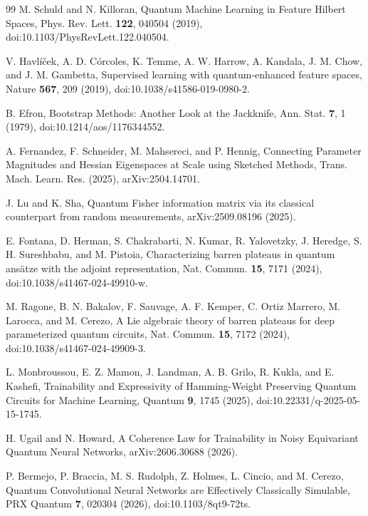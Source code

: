 \documentclass[aps,pra,reprint,superscriptaddress,nofootinbib,longbibliography]{revtex4-2}
\begin{document}
\begin{thebibliography}{99}
M. Schuld and N. Killoran,
Quantum Machine Learning in Feature Hilbert Spaces,
Phys. Rev. Lett. \textbf{122}, 040504 (2019),
doi:10.1103/PhysRevLett.122.040504.

V. Havl\'{i}\v{c}ek, A. D. C\'{o}rcoles, K. Temme, A. W. Harrow, A. Kandala, J. M. Chow, and J. M. Gambetta,
Supervised learning with quantum-enhanced feature spaces,
Nature \textbf{567}, 209 (2019),
doi:10.1038/s41586-019-0980-2.

B. Efron,
Bootstrap Methods: Another Look at the Jackknife,
Ann. Stat. \textbf{7}, 1 (1979),
doi:10.1214/aos/1176344552.



A. Fernandez, F. Schneider, M. Mahsereci, and P. Hennig,
Connecting Parameter Magnitudes and Hessian Eigenspaces at Scale using Sketched Methods,
Trans. Mach. Learn. Res. (2025), arXiv:2504.14701.

J. Lu and K. Sha,
Quantum Fisher information matrix via its classical counterpart from random measurements,
arXiv:2509.08196 (2025).

E. Fontana, D. Herman, S. Chakrabarti, N. Kumar, R. Yalovetzky, J. Heredge,
S. H. Sureshbabu, and M. Pistoia,
Characterizing barren plateaus in quantum ans\"atze with the adjoint representation,
Nat. Commun. \textbf{15}, 7171 (2024),
doi:10.1038/s41467-024-49910-w.

M. Ragone, B. N. Bakalov, F. Sauvage, A. F. Kemper, C. Ortiz Marrero,
M. Larocca, and M. Cerezo,
A Lie algebraic theory of barren plateaus for deep parameterized quantum circuits,
Nat. Commun. \textbf{15}, 7172 (2024),
doi:10.1038/s41467-024-49909-3.

L. Monbroussou, E. Z. Mamon, J. Landman, A. B. Grilo, R. Kukla, and E. Kashefi,
Trainability and Expressivity of Hamming-Weight Preserving Quantum Circuits for Machine Learning,
Quantum \textbf{9}, 1745 (2025),
doi:10.22331/q-2025-05-15-1745.

H. Ugail and N. Howard,
A Coherence Law for Trainability in Noisy Equivariant Quantum Neural Networks,
arXiv:2606.30688 (2026).

P. Bermejo, P. Braccia, M. S. Rudolph, Z. Holmes, L. Cincio, and M. Cerezo,
Quantum Convolutional Neural Networks are Effectively Classically Simulable,
PRX Quantum \textbf{7}, 020304 (2026),
doi:10.1103/8qt9-72ts.


\end{thebibliography}
\end{document}
